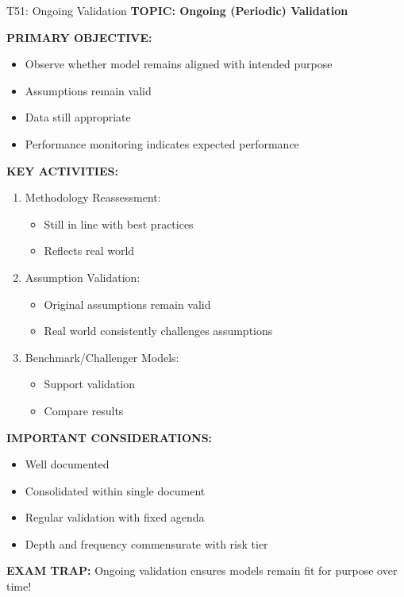 \documentclass[8pt]{beamer}
\begin{document}
	\begin{frame}{T51: Ongoing Validation}
		\fontsize{6.5}{7.5}\selectfont
		\textbf{TOPIC: Ongoing (Periodic) Validation}
		
		\vspace{0.1cm}
		\textbf{PRIMARY OBJECTIVE:}
		\begin{itemize}
			\item Observe whether model remains aligned with intended purpose
			\item Assumptions remain valid
			\item Data still appropriate
			\item Performance monitoring indicates expected performance
		\end{itemize}
		
		\vspace{0.1cm}
		\textbf{KEY ACTIVITIES:}
		\begin{enumerate}
			\item \textcolor{myblue}{Methodology Reassessment:}
			\begin{itemize}
				\item Still in line with best practices
				\item Reflects real world
			\end{itemize}
			\item \textcolor{myblue}{Assumption Validation:}
			\begin{itemize}
				\item Original assumptions remain valid
				\item Real world consistently challenges assumptions
			\end{itemize}
			\item \textcolor{myblue}{Benchmark/Challenger Models:}
			\begin{itemize}
				\item Support validation
				\item Compare results
			\end{itemize}
		\end{enumerate}
		
		\vspace{0.1cm}
		\textbf{IMPORTANT CONSIDERATIONS:}
		\begin{itemize}
			\item Well documented
			\item Consolidated within single document
			\item Regular validation with fixed agenda
			\item Depth and frequency commensurate with risk tier
		\end{itemize}
		
		\textcolor{myred}{\textbf{EXAM TRAP:}} Ongoing validation ensures \textcolor{myblue}{models remain fit for purpose over time}!
	\end{frame}
	
\end{document}
